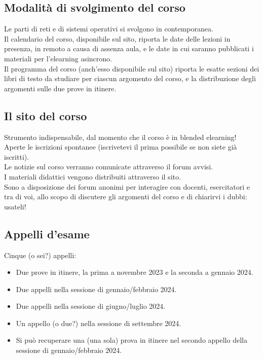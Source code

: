 \subsection{Modalità di svolgimento del corso}
Le parti di reti e di sistemi operativi si svolgono in contemporanea.\\
Il calendario del corso, disponibile sul sito, riporta le date delle lezioni in presenza, in remoto a causa di assenza aula, e le date in cui saranno pubblicati i materiali per l'elearning asincrono.\\
Il programma del corso (anch'esso disponibile sul sito) riporta le esatte sezioni dei libri di testo da studiare per ciascun argomento del corso, e la distribuzione degli argomenti sulle due prove in itinere.

\subsection{Il sito del corso}
Strumento indispensabile, dal momento che il corso è in blended elearning!\\
Aperte le iscrizioni spontanee (iscrivetevi il prima possibile se non siete già iscritti).\\
Le notizie sul corso verranno comunicate attraverso il forum avvisi.\\
I materiali didattici vengono distribuiti attraverso il sito.\\
Sono a disposizione dei forum anonimi per interagire con docenti, esercitatori e tra di voi, allo scopo di discutere gli argomenti del corso e di chiarirvi i dubbi: usateli!

\subsection{Appelli d'esame}
Cinque (o sei?) appelli:
\begin{itemize}
    \item Due prove in itinere, la prima a novembre 2023 e la seconda a gennaio 2024.
    \item Due appelli nella sessione di gennaio/febbraio 2024.
    \item Due appelli nella sessione di giugno/luglio 2024.
    \item Un appello (o due?) nella sessione di settembre 2024.
    \item Si può recuperare una (una sola) prova in itinere nel secondo appello della sessione di gennaio/febbraio 2024.
\end{itemize}

